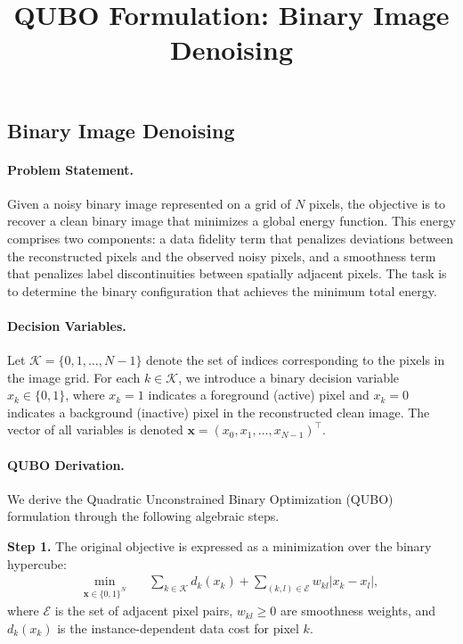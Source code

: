 \documentclass[12pt]{article}
\title{QUBO Formulation: Binary Image Denoising}
\date{}
\begin{document}
\maketitle

\subsection*{Binary Image Denoising}

\paragraph{Problem Statement.}
Given a noisy binary image represented on a grid of $N$ pixels, the objective is to recover a clean binary image that minimizes a global energy function. This energy comprises two components: a data fidelity term that penalizes deviations between the reconstructed pixels and the observed noisy pixels, and a smoothness term that penalizes label discontinuities between spatially adjacent pixels. The task is to determine the binary configuration that achieves the minimum total energy.

\paragraph{Decision Variables.}
Let $\mathcal{K} = \{0, 1, \dots, N-1\}$ denote the set of indices corresponding to the pixels in the image grid. For each $k \in \mathcal{K}$, we introduce a binary decision variable $x_k \in \{0,1\}$, where $x_k = 1$ indicates a foreground (active) pixel and $x_k = 0$ indicates a background (inactive) pixel in the reconstructed clean image. The vector of all variables is denoted $\mathbf{x} = (x_0, x_1, \dots, x_{N-1})^\top$.

\paragraph{QUBO Derivation.}
We derive the Quadratic Unconstrained Binary Optimization (QUBO) formulation through the following algebraic steps.

\textbf{Step 1.} The original objective is expressed as a minimization over the binary hypercube:
\begin{align}
\min_{\mathbf{x} \in \{0,1\}^N} \quad & \sum_{k \in \mathcal{K}} d_k(x_k) + \sum_{(k,l) \in \mathcal{E}} w_{kl} |x_k - x_l|,
\end{align}
where $\mathcal{E}$ is the set of adjacent pixel pairs, $w_{kl} \geq 0$ are smoothness weights, and $d_k(x_k)$ is the instance-dependent data cost for pixel $k$.
\end{document}
